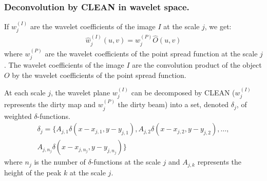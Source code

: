 \subsubsection{Deconvolution by CLEAN in wavelet space.}

If $w_j^{(I)}$ are the wavelet 
coefficients of  the image $I$ at the scale $j$, we
get:
\begin{eqnarray}
\hat{w}_j^{(I)}(u,v) =  \hat{w}_j^{(P)} \hat{O}(u,v) 
\end{eqnarray}
where $w_{j}^{(P)}$ are the wavelet coefficients of the point spread 
function at the scale $j$.
The wavelet coefficients of the image $I$ are the   convolution product
of the object $O$ by the  wavelet coefficients of the point spread 
function.

At each scale $j$, the wavelet plane $w_j^{(I)}$ can be decomposed by CLEAN 
($w_j^{(I)}$ represents the dirty map and $w_{j}^{(P)}$  the dirty beam)
into a set, denoted $\delta_j$, of weighted $\delta$-functions.
\begin{eqnarray}
\delta_j  = \{A_{j,1} \delta(x-x_{j,1}, y-y_{j,1}), A_{j,2} \delta(x-x_{j,2},
 y-y_{j,2}), \dots,  \\ \nonumber
A_{j,n_j} \delta(x-x_{j,n_j}, y-y_{j,n_j})\}
\end{eqnarray}
 where $n_j$ is the number of $\delta$-functions at the scale $j$  
and $A_{j,k}$ represents the height of the peak $k$ at the scale $j$.

